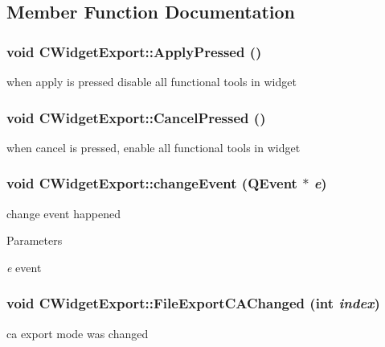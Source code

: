 \subsection{Member Function Documentation}
\hypertarget{classCWidgetExport_a7ca1b32fdd9e190b55d9a9615330428d}{
\subsubsection[{ApplyPressed}]{\setlength{\rightskip}{0pt plus 5cm}void CWidgetExport::ApplyPressed ()}}
\label{classCWidgetExport_a7ca1b32fdd9e190b55d9a9615330428d}
when apply is pressed disable all functional tools in widget \hypertarget{classCWidgetExport_a6f65d412e920fe19eb7aba4d375e626e}{
\subsubsection[{CancelPressed}]{\setlength{\rightskip}{0pt plus 5cm}void CWidgetExport::CancelPressed ()}}
\label{classCWidgetExport_a6f65d412e920fe19eb7aba4d375e626e}
when cancel is pressed, enable all functional tools in widget \hypertarget{classCWidgetExport_ade6f164eed254a2ea1bf24bc21476522}{
\subsubsection[{changeEvent}]{\setlength{\rightskip}{0pt plus 5cm}void CWidgetExport::changeEvent (QEvent $\ast$ {\em e})}}
\label{classCWidgetExport_ade6f164eed254a2ea1bf24bc21476522}
change event happened


\begin{DoxyParams}{Parameters}
\item[{\em e}]event \end{DoxyParams}
\hypertarget{classCWidgetExport_af13bcc06e192560f5c306d54d267c43c}{
\subsubsection[{FileExportCAChanged}]{\setlength{\rightskip}{0pt plus 5cm}void CWidgetExport::FileExportCAChanged (int {\em index})}}
\label{classCWidgetExport_af13bcc06e192560f5c306d54d267c43c}
ca export mode was changed


